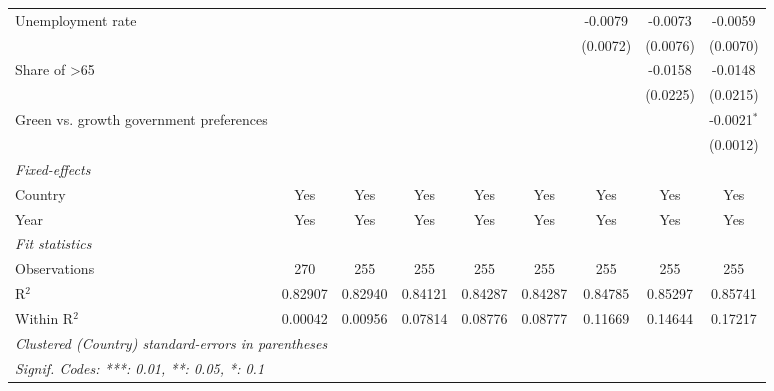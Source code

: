 \begin{table}[htbp]
\begin{tabular}{lcccccccc}
      Unemployment rate                                 &          &          &              &               &               & -0.0079       & -0.0073        & -0.0059\\   
                                                        &          &          &              &               &               & (0.0072)      & (0.0076)       & (0.0070)\\   
      Share of >65                                      &          &          &              &               &               &               & -0.0158        & -0.0148\\   
                                                        &          &          &              &               &               &               & (0.0225)       & (0.0215)\\   
      Green vs. growth government preferences           &          &          &              &               &               &               &                & -0.0021$^{*}$\\   
                                                        &          &          &              &               &               &               &                & (0.0012)\\   
      \midrule
      \emph{Fixed-effects}\\
      Country                                           & Yes      & Yes      & Yes          & Yes           & Yes           & Yes           & Yes            & Yes\\  
      Year                                              & Yes      & Yes      & Yes          & Yes           & Yes           & Yes           & Yes            & Yes\\  
      \midrule
      \emph{Fit statistics}\\
      Observations                                      & 270      & 255      & 255          & 255           & 255           & 255           & 255            & 255\\  
      R$^2$                                             & 0.82907  & 0.82940  & 0.84121      & 0.84287       & 0.84287       & 0.84785       & 0.85297        & 0.85741\\  
      Within R$^2$                                      & 0.00042  & 0.00956  & 0.07814      & 0.08776       & 0.08777       & 0.11669       & 0.14644        & 0.17217\\  
      \midrule \midrule
      \multicolumn{9}{l}{\emph{Clustered (Country) standard-errors in parentheses}}\\
      \multicolumn{9}{l}{\emph{Signif. Codes: ***: 0.01, **: 0.05, *: 0.1}}\\
   \end{tabular}
\end{table}


